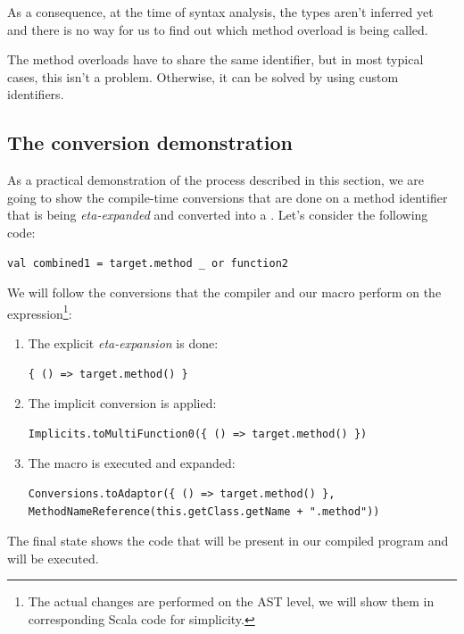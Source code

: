 As a consequence, at the time of syntax analysis, the types aren't inferred yet and there is no way for us to find out which method overload is being called.

The method overloads have to share the same identifier, but in most typical cases, this isn't a problem. Otherwise, it can be solved by using custom identifiers.

\subsection{The conversion demonstration}

As a practical demonstration of the process described in this section, we are going to show the compile-time conversions that are done on a method identifier that is being \textit{eta-expanded} and converted into a . Let's consider the following code:

\lstset{style=Scala}
\begin{lstlisting}
val combined1 = target.method _ or function2
\end{lstlisting}

We will follow the conversions that the compiler and our macro perform on the  expression\footnote{The actual changes are performed on the AST level, we will show them in corresponding Scala code for simplicity.}:

\begin{enumerate}
	\item The explicit \textit{eta-expansion} is done:
	\lstset{style=Scala}
	\begin{lstlisting}
{ () => target.method() }
	\end{lstlisting}
	\item The implicit conversion is applied:
		\lstset{style=Scala}
	\begin{lstlisting}
Implicits.toMultiFunction0({ () => target.method() })
		\end{lstlisting}
		\item The macro  is executed and expanded:
		\lstset{style=Scala}
		\begin{lstlisting}
Conversions.toAdaptor({ () => target.method() }, MethodNameReference(this.getClass.getName + ".method"))
		\end{lstlisting}
\end{enumerate}

The final state shows the code that will be present in our compiled program and will be executed.

